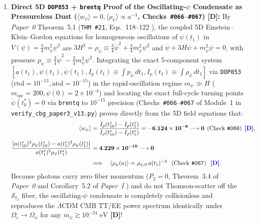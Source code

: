 \documentclass[11pt,a4paper]{article}
\newcommand{\catD}{\textbf{\textcolor{blue!75!black}{[D]}}}
\theoremstyle{plain}
\theoremstyle{definition}
\theoremstyle{remark}
\numberwithin{equation}{section}
\begin{document}
\begin{enumerate}
  \item \textbf{Direct 5D \texttt{DOP853} + \texttt{brentq} Proof of the Oscillating-$\psi$ Condensate as Pressureless Dust ($\langle w_{\psi}\rangle = 0, \langle\rho_{\psi}\rangle \propto a^{-3}$, Checks~\texttt{\#066}--\texttt{\#067}) \catD:} By \textit{Paper~0} Theorem~5.1 (\texttt{THM \#21}, Eqs.~118--122 \cite{jimenez2026_p0}), the coupled 5D Einstein--Klein--Gordon equations for homogeneous oscillations of $\psi(t_1)$ in $V(\psi) = \frac{3}{4}m_{\psi}^2\psi^2$ are $3H^2 = \rho_{\psi} \equiv \frac{3}{4}\dot{\psi}^2 + \frac{3}{4}m_{\psi}^2\psi^2$ and $\ddot{\psi} + 3H\dot{\psi} + m_{\psi}^2\psi = 0$, with pressure $p_{\psi} \equiv \frac{3}{4}\dot{\psi}^2 - \frac{3}{4}m_{\psi}^2\psi^2$. Integrating the exact 5-component system $[a(t_1), \psi(t_1), \dot{\psi}(t_1), I_p(t_1) \equiv \int p_{\psi}\,dt_1, I_{\rho}(t_1) \equiv \int \rho_{\psi}\,dt_1]$ via \texttt{DOP853} ($\text{rtol}=10^{-13}, \text{atol}=10^{-15}$) in the rapid-oscillation regime $m_{\psi} \gg H$ ($m_{\text{osc}} = 200, \psi(0) = 2\times 10^{-4}$) and locating the exact full-cycle turning points $\dot{\psi}(t_k^*) = 0$ via \texttt{brentq} to $10^{-15}$ precision (Checks~\texttt{\#066}--\texttt{\#067} of Module~1 in \allowbreak\texttt{verify\_cbg\_paper3\_v13.py}) proves directly from the 5D field equations that:
  \begin{align}
    \langle w_{\psi}\rangle &= \frac{I_p(t_{10}^*) - I_p(t_1^*)}{I_{\rho}(t_{10}^*) - I_{\rho}(t_1^*)} = \mathbf{-6.124 \times 10^{-8} \longrightarrow 0} \;\left(\text{Check~\texttt{\#066}}\right) \;\catD, \nonumber \\[4pt]
    \frac{\left\lvert a(t_{10}^*)^3\rho_{\psi}(t_{10}^*) - a(t_1^*)^3\rho_{\psi}(t_1^*)\right\rvert}{a(t_1^*)^3\rho_{\psi}(t_1^*)} &= \mathbf{4.229 \times 10^{-10} \longrightarrow 0} \nonumber \\[3pt]
    &\Longrightarrow \quad \langle\rho_{\psi}(a)\rangle = \rho_{\psi,0}\,a(t_1)^{-3} \;\;\left(\text{Check~\texttt{\#067}}\right) \;\;\catD.
    \label{eq:oscillating_psi_cdm}
  \end{align}
  Because photons carry zero fiber momentum ($P_2 = 0$, Theorem~3.4 of \textit{Paper~0} \cite{jimenez2026_p0} and Corollary~5.2 of \textit{Paper~I} \cite{jimenez2026a}) and do not Thomson-scatter off the $\mathcal{S}_{t_2}$ fiber, the oscillating-$\psi$ condensate is completely collisionless and reproduces the $\Lambda\text{CDM}$ CMB TT/EE power spectrum identically under $\Omega_c \rightarrow \Omega_{\psi}$ for any $m_{\psi} \gtrsim 10^{-24}\text{ eV}$ \cite{hlozek2015} \catD!

\end{enumerate}
\end{document}
